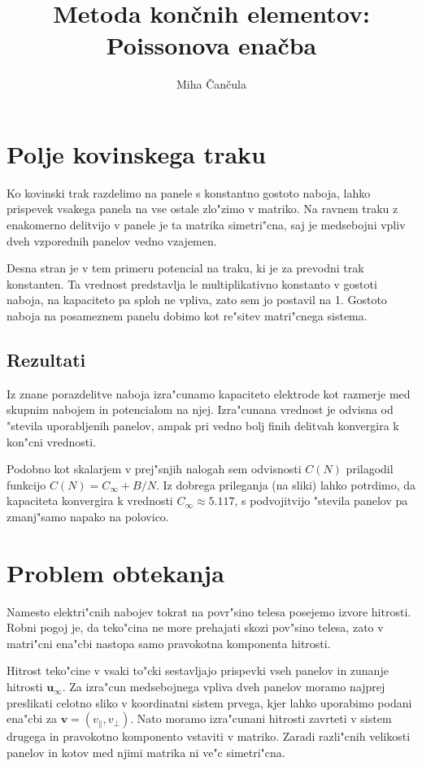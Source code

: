 \documentclass[a4paper,10pt]{article}
\title{Metoda kon\v cnih elementov: \\ Poissonova ena\v cba}
\author{Miha \v Can\v cula}
\renewcommand{\vec}{\mathbf}
\begin{document}
\maketitle

\section{Polje kovinskega traku}

Ko kovinski trak razdelimo na panele s konstantno gostoto naboja, lahko prispevek vsakega panela na vse ostale zlo"zimo v matriko. Na ravnem traku z enakomerno delitvijo v panele je ta matrika simetri"cna, saj je medsebojni vpliv dveh vzporednih panelov vedno vzajemen. 

Desna stran je v tem primeru potencial na traku, ki je za prevodni trak konstanten. Ta vrednost predstavlja le multiplikativno konstanto v gostoti naboja, na kapaciteto pa sploh ne vpliva, zato sem jo postavil na 1. Gostoto naboja na posameznem panelu dobimo kot re"sitev matri"cnega sistema. 

\subsection{Rezultati}



Iz znane porazdelitve naboja izra"cunamo kapaciteto elektrode kot razmerje med skupnim nabojem in potencialom na njej. Izra"cunana vrednost je odvisna od "stevila uporabljenih panelov, ampak pri vedno bolj finih delitvah konvergira k kon"cni vrednosti. 



Podobno kot skalarjem v prej"snjih nalogah sem odvisnosti $C(N)$ prilagodil funkcijo $C(N) = C_\infty + B/N$. Iz dobrega prileganja (na sliki) lahko potrdimo, da kapaciteta konvergira k vrednosti $C_\infty \approx 5.117$, s podvojitvijo "stevila panelov pa zmanj"samo napako na polovico. 

\section{Problem obtekanja}

Namesto elektri"cnih nabojev tokrat na povr"sino telesa posejemo izvore hitrosti. Robni pogoj je, da teko"cina ne more prehajati skozi pov"sino telesa, zato v matri"cni ena"cbi nastopa samo pravokotna komponenta hitrosti. 

Hitrost teko"cine v vsaki to"cki sestavljajo prispevki vseh panelov in zunanje hitrosti $\vec u_\infty$. Za izra"cun medsebojnega vpliva dveh panelov moramo najprej preslikati celotno sliko v koordinatni sistem prvega, kjer lahko uporabimo podani ena"cbi za $\vec v = (v_\parallel,v_\perp)$. Nato moramo izra"cunani hitrosti zavrteti v sistem drugega in pravokotno komponento vstaviti v matriko. Zaradi razli"cnih velikosti panelov in kotov med njimi matrika ni ve"c simetri"cna. 
\end{document}

